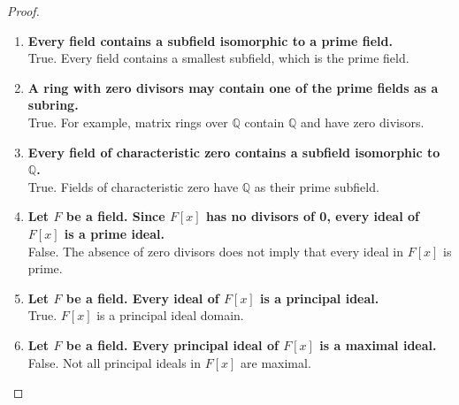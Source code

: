 \documentclass[12pt]{amsart}
\theoremstyle{definition}
\numberwithin{equation}{section}
\theoremstyle{plain}
\begin{document}
\begin{exercise}{14}
\begin{proof}
\begin{enumerate}[label=\alph*.]
    \item \textbf{Every field contains a subfield isomorphic to a prime field.} \\
    True. Every field contains a smallest subfield, which is the prime field.

    \item \textbf{A ring with zero divisors may contain one of the prime fields as a subring.} \\
    True. For example, matrix rings over \(\mathbb{Q}\) contain \(\mathbb{Q}\) and have zero divisors.

    \item \textbf{Every field of characteristic zero contains a subfield isomorphic to \(\mathbb{Q}\).} \\
    True. Fields of characteristic zero have \(\mathbb{Q}\) as their prime subfield.

    \item \textbf{Let \(F\) be a field. Since \(F[x]\) has no divisors of 0, every ideal of \(F[x]\) is a prime ideal.} \\
    False. The absence of zero divisors does not imply that every ideal in \(F[x]\) is prime.

    \item \textbf{Let \(F\) be a field. Every ideal of \(F[x]\) is a principal ideal.} \\
    True. \(F[x]\) is a principal ideal domain.

    \item \textbf{Let \(F\) be a field. Every principal ideal of \(F[x]\) is a maximal ideal.} \\
    False. Not all principal ideals in \(F[x]\) are maximal.
\end{enumerate}
\end{proof}
\end{exercise}
\vspace*{20pt}
\end{document}
